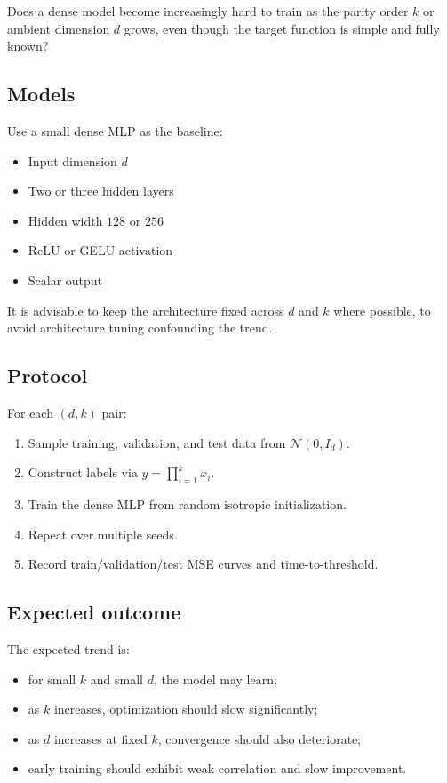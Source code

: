 \documentclass[11pt]{article}
\begin{document}
Does a dense model become increasingly hard to train as the parity order $k$ or ambient dimension $d$ grows, even though the target function is simple and fully known?

\subsection{Models}

Use a small dense MLP as the baseline:
\begin{itemize}[leftmargin=2em]
    \item Input dimension $d$
    \item Two or three hidden layers
    \item Hidden width $128$ or $256$
    \item ReLU or GELU activation
    \item Scalar output
\end{itemize}

It is advisable to keep the architecture fixed across $d$ and $k$ where possible, to avoid architecture tuning confounding the trend.

\subsection{Protocol}

For each $(d,k)$ pair:
\begin{enumerate}[leftmargin=2em]
    \item Sample training, validation, and test data from $\mathcal{N}(0,I_d)$.
    \item Construct labels via $y = \prod_{i=1}^{k} x_i$.
    \item Train the dense MLP from random isotropic initialization.
    \item Repeat over multiple seeds.
    \item Record train/validation/test MSE curves and time-to-threshold.
\end{enumerate}

\subsection{Expected outcome}

The expected trend is:
\begin{itemize}[leftmargin=2em]
    \item for small $k$ and small $d$, the model may learn;
    \item as $k$ increases, optimization should slow significantly;
    \item as $d$ increases at fixed $k$, convergence should also deteriorate;
    \item early training should exhibit weak correlation and slow improvement.
\end{itemize}
\end{document}
